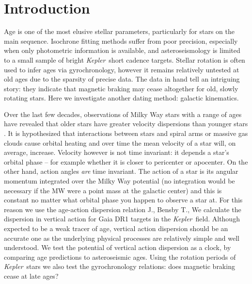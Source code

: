 \documentclass[useAMS, usenatbib, preprint, 12pt]{aastex}
\newcommand{\Kepler}{{\it Kepler}}
\newcommand{\kepler}{\Kepler}
\newcommand{\eg}{{\it e.g.}}
\begin{document}
\section{Introduction}

Age is one of the most elusive stellar parameters, particularly for stars on
the main sequence.
Isochrone fitting methods suffer from poor precision, especially when only
photometric information is available, and asteroseismology is limited to a
small sample of bright \kepler\ short cadence targets.
Stellar rotation is often used to infer ages via gyrochronology, however it
remains relatively untested at old ages due to the sparsity of precise data.
The data in hand tell an intriguing story: they indicate that magnetic braking
may cease altogether for old, slowly rotating stars.
Here we investigate another dating method: galactic kinematics.

Over the last few decades, observations of Milky Way stars with a range of
ages have revealed that older stars have greater velocity dispersions than
younger stars \citep[\eg][]{casagrande2011, aumer2011}.
It is hypothesized that interactions between stars and spiral arms or massive
gas clouds cause orbital heating and over time the mean velocity of a star
will, on average, increase.
Velocity however is not time invariant: it depends a star's orbital phase --
for example whether it is closer to pericenter or apocenter.
On the other hand, action angles {\it are} time invariant.
The action of a star is its angular momentum integrated over the Milky Way
potential (no integration would be necessary if the MW were a point mass at
the galactic center) and this is constant no matter what orbital phase you
happen to observe a star at.
For this reason we use the age-action dispersion relation
J., Bensby T.,
We calculate the dispersion in vertical action for Gaia DR1 targets in the
\kepler\ field.
Although expected to be a weak tracer of age, vertical action dispersion
should be an accurate one as the underlying physical processes are relatively
simple and well understood.
We test the potential of vertical action dispersion as a clock, by comparing
age predictions to asteroseismic ages.
Using the rotation periods of \kepler\ stars we also test the gyrochronology
relations: does magnetic braking cease at late ages?
\end{document}
